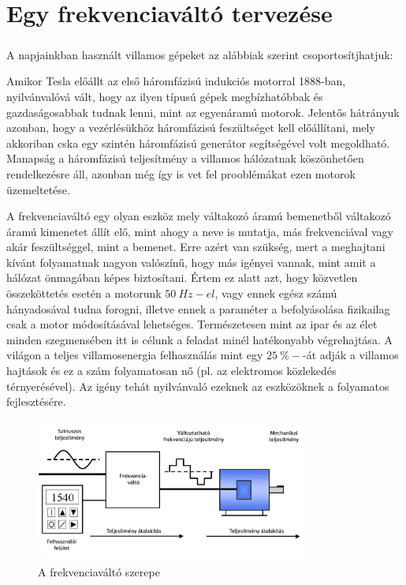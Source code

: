 \chapter{Egy frekvenciaváltó tervezése}

\paragraph{}

A napjainkban használt villamos gépeket az alábbiak szerint csoportosítjhatjuk:


Amikor Tesla előállt az első háromfázisú indukciós motorral 1888-ban, nyilvánvalóvá vált, hogy az ilyen típusú gépek megbízhatóbbak és gazdaságosabbak tudnak lenni, mint az egyenáramú motorok. Jelentős hátrányuk azonban, hogy a vezérlésükhöz háromfázisú feszültséget kell előállítani, mely akkoriban cska egy szintén háromfázisú generátor segítségével volt megoldható. Manapság a háromfázisú teljesítmény a villamos hálózatnak köszönhetően rendelkezésre áll, azonban még így is vet fel prooblémákat ezen motorok üzemeltetése.

A frekvenciaváltó egy olyan eszköz mely váltakozó áramú bemenetből váltakozó áramú kimenetet állít elő, mint ahogy a neve is mutatja, más frekvenciával vagy akár feszültséggel, mint a bemenet. Erre azért van szükség, mert a meghajtani kívánt folyamatnak nagyon valószínű, hogy más igényei vannak, mint amit a hálózat önmagában képes biztosítani. Értem ez alatt azt, hogy közvetlen összeköttetés esetén a motorunk $50\ Hz-el$, vagy ennek egész számú hányadosával tudna forogni, illetve ennek a paraméter a befolyásolása fizikailag csak a motor módosításával lehetséges. Természetesen mint az ipar és az élet minden szegmensében itt is célunk a feladat minél hatékonyabb végrehajtása. A világon a teljes villamosenergia felhasználás mint egy $25\ \%-$-át adják a villamos hajtások és ez a szám folyamatosan nő (pl. az elektromos közlekedés térnyerésével). Az igény tehát nyilvánvaló ezeknek az eszközöknek a folyamatos fejlesztésére.

\begin{figure}[!h]
	\centering
	\includegraphics[width = 0.8\textwidth]{figures/VFD_System.jpg}
	\caption{A frekvenciaváltó szerepe} 
	\label{fig:vfd_system}
\end{figure}

